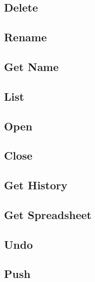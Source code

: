 \subsection{Delete}
\label{sec:message:delete}


\subsection{Rename}
\label{sec:message:rename}


\subsection{Get Name}
\label{sec:message:get_name}


\subsection{List}
\label{sec:message:list}


\subsection{Open}
\label{sec:message:open}


\subsection{Close}
\label{sec:message:close}


\subsection{Get History}
\label{sec:message:get_history}


\subsection{Get Spreadsheet}
\label{sec:message:get_spreadsheet}


\subsection{Undo}
\label{sec:message:undo}


\subsection{Push}
\label{sec:message:push}

